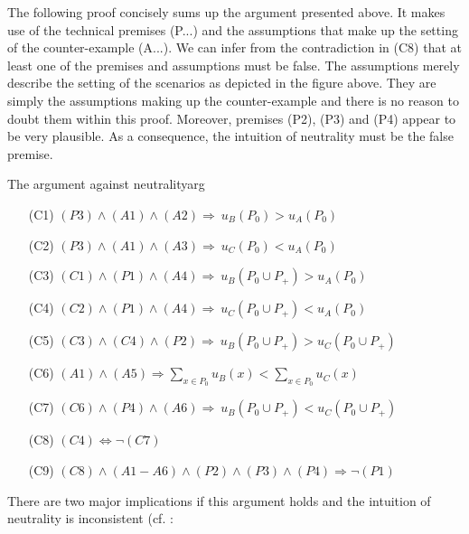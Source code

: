 The following proof concisely sums up the argument presented above. It makes use of the technical premises (P...) and the assumptions that make up the setting of the counter-example (A...). We can infer from the contradiction in (C8) that at least one of the premises and assumptions must be false. The assumptions merely describe the setting of the scenarios as depicted in the figure above. They are simply the assumptions making up the counter-example and there is no reason to doubt them within this proof. Moreover, premises (P2), (P3) and (P4) appear to be very plausible. As a consequence, the intuition of neutrality must be the false premise. 

\begin{Proof}{The argument against neutrality}{arg}
\begin{enumerate}
\item[(C1)] \hspace{1cm}
$(P3) \wedge (A1) \wedge (A2) \Rightarrow \ u_B(P_0) > u_A(P_0)$
\item[(C2)] \hspace{1cm}
$(P3) \wedge (A1) \wedge (A3) \Rightarrow \ u_C(P_0) < u_A(P_0)$
\item[(C3)] \hspace{1cm}
$(C1) \wedge (P1) \wedge (A4) \Rightarrow \ u_B(P_0 \cup P_+) > u_A(P_0)$
\item[(C4)] \hspace{1cm}
$(C2) \wedge (P1) \wedge (A4) \Rightarrow \ u_C(P_0 \cup P_+) < u_A(P_0)$
\item[(C5)] \hspace{1cm}
$(C3) \wedge (C4) \wedge (P2) \Rightarrow \ u_B(P_0 \cup P_+) > u_C(P_0 \cup P_+)$
\item[(C6)] \hspace{1cm}
$(A1) \wedge (A5) \Rightarrow \sum_{x\in P_0} u_B(x) < \sum_{x \in P_0} u_C(x)$
\item[(C7)] \hspace{1cm}
$(C6) \wedge (P4) \wedge (A6) \Rightarrow  \ u_B(P_0 \cup P_+) < u_C(P_0 \cup P_+)$
\item[(C8)] \hspace{1cm}
$(C4) \Leftrightarrow \neg (C7)$
\item[(C9)] \hspace{1cm}
$(C8) \wedge (A1-A6) \wedge (P2) \wedge (P3) \wedge (P4) \Rightarrow \neg (P1)$
\end{enumerate}
\end{Proof}

There are two major implications if this argument holds and the intuition of neutrality is inconsistent (cf. : 

